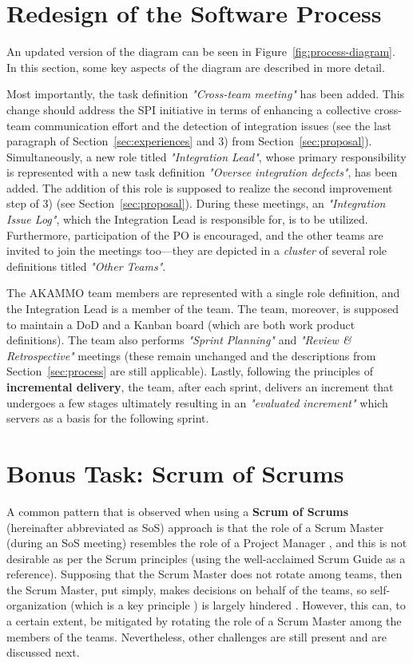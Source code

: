 \documentclass[conference]{IEEEtran}
\begin{document}
\section{Redesign of the Software Process}
\label{sec:redesign}

An updated version of the diagram can be seen in
Figure~\ref{fig:process-diagram}. In this section, some key aspects of the
diagram are described in more detail.

Most importantly, the task definition \textit{"Cross-team meeting"} has been
added. This change should address the SPI initiative in terms of enhancing a
collective cross-team communication effort and the detection of integration
issues (see the last paragraph of Section~\ref{sec:experiences} and 3) from
Section~\ref{sec:proposal}). Simultaneously, a new role titled
\textit{"Integration Lead"}, whose primary responsibility is represented with a
new task definition \textit{"Oversee integration defects"}, has been added. The
addition of this role is supposed to realize the second improvement step of 3)
(see Section~\ref{sec:proposal}). During these meetings, an
\textit{"Integration Issue Log"}, which the Integration Lead is responsible
for, is to be utilized. Furthermore, participation of the PO is encouraged, and
the other teams are invited to join the meetings too---they are depicted in a
\textit{cluster} of several role definitions titled \textit{"Other Teams"}.

The \selectfont AKAMMO\rmfamily{} team members are represented
with a single role definition, and the Integration Lead is a member of the
team. The team, moreover, is supposed to maintain a DoD and a Kanban board
(which are both work product definitions). The team also performs
\textit{"Sprint Planning"} and \textit{"Review \& Retrospective"} meetings
(these remain unchanged and the descriptions from Section~\ref{sec:process} are
still applicable). Lastly, following the principles of \textbf{incremental
delivery}, the team, after each sprint, delivers an increment that undergoes a
few stages ultimately resulting in an \textit{"evaluated increment"} which
servers as a basis for the following sprint.

\section{Bonus Task: Scrum of Scrums}
\label{sec:bonus_task}

A common pattern that is observed when using a \textbf{Scrum of Scrums}
(hereinafter abbreviated as SoS) approach is that the role of a Scrum Master
(during an SoS meeting) resembles the role of a Project Manager
\cite{Larman2010}, and this is not desirable as per the Scrum principles (using
the well-acclaimed Scrum Guide \cite{Schwaber2020} as a reference). Supposing
that the Scrum Master does not rotate among teams, then the Scrum Master, put
simply, makes decisions on behalf of the teams, so self-organization (which is
a key principle \cite{Dikert2016}) is largely hindered \cite{Larman2010}.
However, this can, to a certain extent, be mitigated by rotating the role of a
Scrum Master among the members of the teams. Nevertheless, other challenges are
still present and are discussed next.
\end{document}
